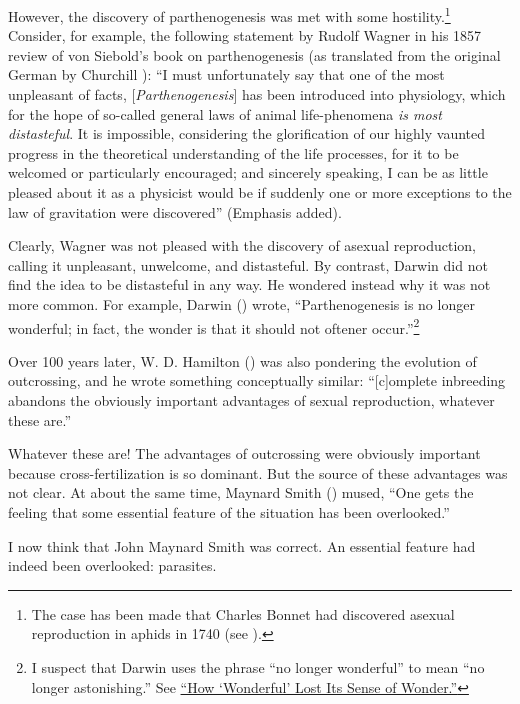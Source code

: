 \documentclass[
  letterpaper,
]{book}
\begin{document}
However, the discovery of parthenogenesis was met with some
hostility.\footnote{The case has been made that Charles Bonnet had
  discovered asexual reproduction in aphids in 1740 (see
  ).} Consider, for example,
the following statement by Rudolf Wagner in his 1857 review of von
Siebold's book on parthenogenesis (as translated from the original
German by Churchill ): ``I must
unfortunately say that one of the most unpleasant of facts,
{[}\emph{Parthenogenesis}{]} has been introduced into physiology, which
for the hope of so-called general laws of animal life-phenomena \emph{is
most distasteful}. It is impossible, considering the glorification of
our highly vaunted progress in the theoretical understanding of the life
processes, for it to be welcomed or particularly encouraged; and
sincerely speaking, I can be as little pleased about it as a physicist
would be if suddenly one or more exceptions to the law of gravitation
were discovered'' (Emphasis added).

Clearly, Wagner was not pleased with the discovery of asexual
reproduction, calling it unpleasant, unwelcome, and distasteful. By
contrast, Darwin did not find the idea to be distasteful in any way. He
wondered instead why it was not more common. For example, Darwin
() wrote, ``Parthenogenesis is no longer
wonderful; in fact, the wonder is that it should not oftener
occur.''\footnote{I suspect that Darwin uses the phrase ``no longer
  wonderful'' to mean ``no longer astonishing.'' See
  \href{https://www.merriam-webster.com/words-at-play/wonderful-word-history-evolution}{``How
  `Wonderful' Lost Its Sense of Wonder.''}}

Over 100 years later, W. D. Hamilton
() was also pondering the evolution
of outcrossing, and he wrote something conceptually similar:
``{[}c{]}omplete inbreeding abandons the obviously important advantages
of sexual reproduction, whatever these are.''

Whatever these are! The advantages of outcrossing were obviously
important because cross-fertilization is so dominant. But the source of
these advantages was not clear. At about the same time, Maynard Smith
() mused, ``One gets the feeling that
some essential feature of the situation has been overlooked.''

I now think that John Maynard Smith was correct. An essential feature
had indeed been overlooked: parasites.
\end{document}
